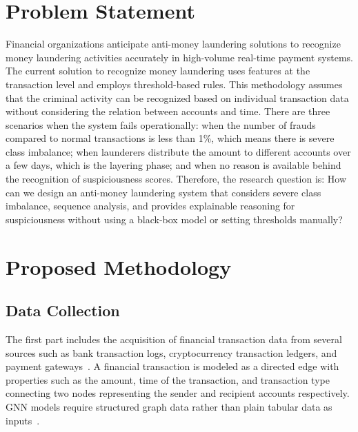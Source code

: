 \documentclass[conference]{IEEEtran}
\begin{document}
\section{Problem Statement}

Financial organizations anticipate anti-money laundering solutions to recognize money laundering activities accurately in high-volume real-time payment systems. The current solution to recognize money laundering uses features at the transaction level and employs threshold-based rules. This methodology assumes that the criminal activity can be recognized based on individual transaction data without considering the relation between accounts and time. There are three scenarios when the system fails operationally: when the number of frauds compared to normal transactions is less than 1\%, which means there is severe class imbalance; when launderers distribute the amount to different accounts over a few days, which is the layering phase; and when no reason is available behind the recognition of suspiciousness scores. Therefore, the research question is: How can we design an anti-money laundering system that considers severe class imbalance, sequence analysis, and provides explainable reasoning for suspiciousness without using a black-box model or setting thresholds manually?

\section{Proposed Methodology}
\label{sec:methodology}

\subsection{Data Collection}
The first part includes the acquisition of financial transaction data from several sources such as bank transaction logs, cryptocurrency transaction ledgers, and payment gateways~\cite{weber2019, altman2023}. A financial transaction is modeled as a directed edge with properties such as the amount, time of the transaction, and transaction type connecting two nodes representing the sender and recipient accounts respectively. GNN models require structured graph data rather than plain tabular data as inputs~\cite{kurshan2021}.
\end{document}
